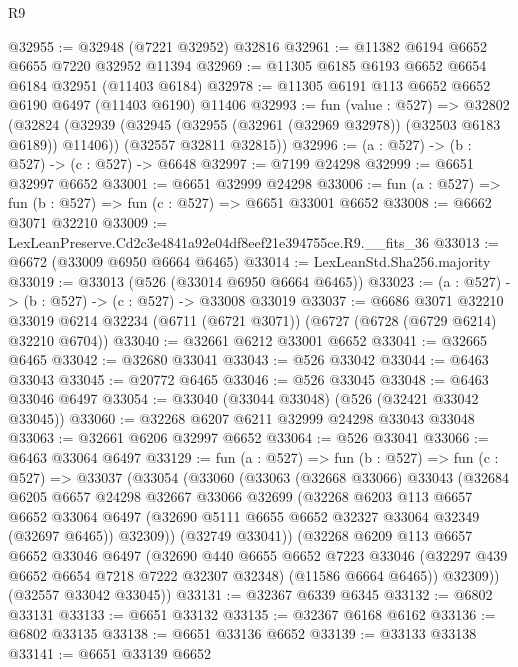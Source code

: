 \begin{lexlean}{R9}
\begin{coremodule}
@32955 := @32948 (@7221 @32952) @32816
@32961 := @11382 @6194 @6652 @6655 @7220 @32952 @11394
@32969 := @11305 @6185 @6193 @6652 @6654 @6184 @32951 (@11403 @6184)
@32978 := @11305 @6191 @113 @6652 @6652 @6190 @6497 (@11403 @6190) @11406
@32993 := fun (value : @527) =>
  @32802
    (@32824
      (@32939 (@32945 (@32955 (@32961 (@32969 @32978)) (@32503 @6183 @6189)) @11406))
      (@32557 @32811 @32815))
@32996 := (a : @527) -> (b : @527) -> (c : @527) -> @6648
@32997 := @7199 @24298
@32999 := @6651 @32997 @6652
@33001 := @6651 @32999 @24298
@33006 := fun (a : @527) => fun (b : @527) => fun (c : @527) => @6651 @33001 @6652
@33008 := @6662 @3071 @32210
@33009 := LexLeanPreserve.Cd2c3e4841a92e04df8eef21e394755ce.R9.__fits_36
@33013 := @6672 (@33009 @6950 @6664 @6465)
@33014 := LexLeanStd.Sha256.majority
@33019 := @33013 (@526 (@33014 @6950 @6664 @6465))
@33023 := (a : @527) -> (b : @527) -> (c : @527) -> @33008 @33019
@33037 := @6686
    @3071
    @32210
    @33019
    @6214
    @32234
    (@6711 (@6721 @3071))
    (@6727 (@6728 (@6729 @6214) @32210 @6704))
@33040 := @32661 @6212 @33001 @6652
@33041 := @32665 @6465
@33042 := @32680 @33041
@33043 := @526 @33042
@33044 := @6463 @33043
@33045 := @20772 @6465
@33046 := @526 @33045
@33048 := @6463 @33046 @6497
@33054 := @33040 (@33044 @33048) (@526 (@32421 @33042 @33045))
@33060 := @32268 @6207 @6211 @32999 @24298 @33043 @33048
@33063 := @32661 @6206 @32997 @6652
@33064 := @526 @33041
@33066 := @6463 @33064 @6497
@33129 := fun (a : @527) =>
  fun (b : @527) =>
  fun (c : @527) =>
  @33037
    (@33054
      (@33060
        (@33063
          (@32668 @33066)
          @33043
          (@32684
            @6205
            @6657
            @24298
            @32667
            @33066
            @32699
            (@32268
              @6203
              @113
              @6657
              @6652
              @33064
              @6497
              (@32690 @5111 @6655 @6652 @32327 @33064 @32349 (@32697 @6465))
              @32309))
          (@32749 @33041))
        (@32268
          @6209
          @113
          @6657
          @6652
          @33046
          @6497
          (@32690
            @440
            @6655
            @6652
            @7223
            @33046
            (@32297 @439 @6652 @6654 @7218 @7222 @32307 @32348)
            (@11586 @6664 @6465))
          @32309))
      (@32557 @33042 @33045))
@33131 := @32367 @6339 @6345
@33132 := @6802 @33131
@33133 := @6651 @33132
@33135 := @32367 @6168 @6162
@33136 := @6802 @33135
@33138 := @6651 @33136 @6652
@33139 := @33133 @33138
@33141 := @6651 @33139 @6652

\end{coremodule}
\end{lexlean}

